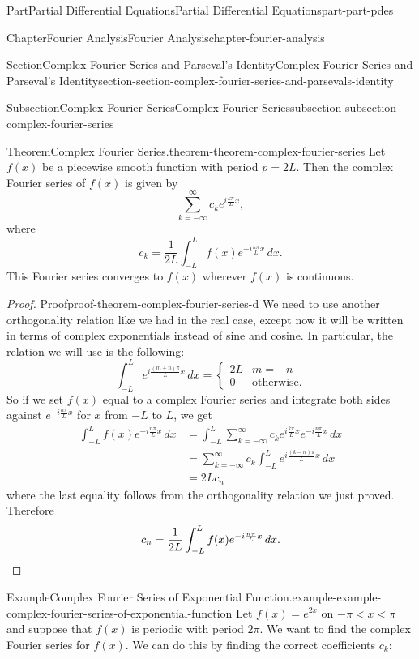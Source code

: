 \documentclass[twoside,10pt,]{book}
\numberwithin{equation}{part}
\newcommand{\qedhere}{\relax}
\newcommand{\amp}{&}
\begin{document}
\begin{partptx}{Part}{Partial Differential Equations}{}{Partial Differential Equations}{}{}{part-part-pdes}
\begin{chapterptx}{Chapter}{Fourier Analysis}{}{Fourier Analysis}{}{}{chapter-fourier-analysis}
\begin{sectionptx}{Section}{Complex Fourier Series and Parseval's Identity}{}{Complex Fourier Series and Parseval's Identity}{}{}{section-section-complex-fourier-series-and-parsevals-identity}
\begin{subsectionptx}{Subsection}{Complex Fourier Series}{}{Complex Fourier Series}{}{}{subsection-subsection-complex-fourier-series}
\begin{theorem}{Theorem}{Complex Fourier Series.}{}{theorem-theorem-complex-fourier-series}
%
Let \(f(x)\) be a piecewise smooth function with period \(p=2L\). Then the complex Fourier series of \(f(x)\) is given by%
\begin{equation*}
\sum_{k=-\infty}^{\infty}c_{k}e^{i\frac{k\pi}{L}x},
\end{equation*}
where%
\begin{equation*}
c_{k} = \frac{1}{2L}\int_{-L}^{L}f(x)e^{-i\frac{k\pi}{L}x}\,dx.
\end{equation*}
This Fourier series converges to \(f(x)\) wherever \(f(x)\) is continuous.%
\end{theorem}
\begin{proof}{Proof}{}{proof-theorem-complex-fourier-series-d}
We need to use another orthogonality relation like we had in the real case, except now it will be written in terms of complex exponentials instead of sine and cosine. In particular, the relation we will use is the following:%
\begin{equation*}
\int_{-L}^{L}e^{i\frac{(m+n)\pi}{L}x}\,dx = \begin{cases} 2L \amp m=-n \\ 0 \amp \text{otherwise.}\end{cases}
\end{equation*}
So if we set \(f(x)\) equal to a complex Fourier series and integrate both sides against \(e^{-i\frac{n\pi}{L}x}\) for \(x\) from \(-L\) to \(L\), we get%
\begin{align*}
\int_{-L}^{L}f(x)e^{-i\frac{n\pi}{L}x}\,dx \amp = \int_{-L}^{L}\sum_{k=-\infty}^{\infty}c_{k}e^{i\frac{k\pi}{L}x}e^{-i\frac{n\pi}{L}x}\,dx \\
\amp= \sum_{k=-\infty}^{\infty}c_{k}\int_{-L}^{L}e^{i\frac{(k-n)\pi}{L}x}\,dx\\
\amp= 2Lc_{n}
\end{align*}
where the last equality follows from the orthogonality relation we just proved. Therefore%
\begin{equation*}
c_{n} = \frac{1}{2L}\int_{-L}^{L}f(x)e^{-i\frac{n\pi}{L}x}\,dx.\qedhere
\end{equation*}
%
\end{proof}
\begin{example}{Example}{Complex Fourier Series of Exponential Function.}{example-example-complex-fourier-series-of-exponential-function}%
Let \(f(x) = e^{2x}\) on \(-\pi<x<\pi\) and suppose that \(f(x)\) is periodic with period \(2\pi\). We want to find the complex Fourier series for \(f(x)\). We can do this by finding the correct coefficients \(c_{k}\):%

\end{example}
\end{subsectionptx}
\end{sectionptx}
\end{chapterptx}
\end{partptx}
\end{document}
